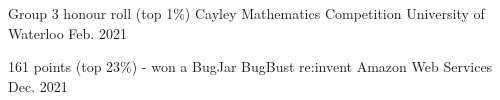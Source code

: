 
\begin{cvhonors}

  \cvhonor
    {Group 3 honour roll (top 1\%)} %
    {Cayley Mathematics Competition} %
    {University of Waterloo} %
    {Feb. 2021} %

  \cvhonor
    {161 points (top 23\%) - won a BugJar}
    {BugBust re:invent}
    {Amazon Web Services}
    {Dec. 2021}

\end{cvhonors}
